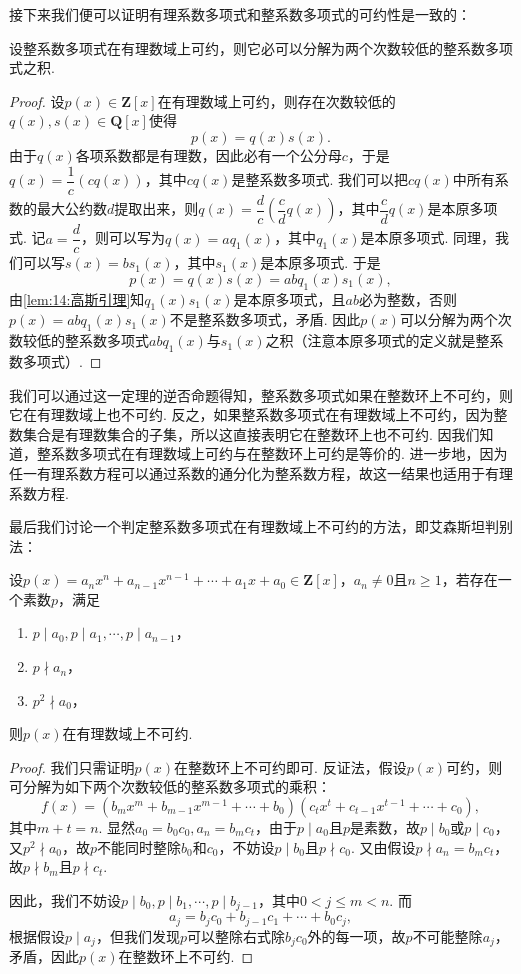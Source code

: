 接下来我们便可以证明有理系数多项式和整系数多项式的可约性是一致的：
\begin{theorem} \label{thm:14:有理系数多项式的可约性}
    设整系数多项式在有理数域上可约，则它必可以分解为两个次数较低的整系数多项式之积.
\end{theorem}
\begin{proof}
    设$p(x)\in\mathbf{Z}[x]$在有理数域上可约，则存在次数较低的$q(x),s(x)\in\mathbf{Q}[x]$使得
    \[p(x)=q(x)s(x).\]
    由于$q(x)$各项系数都是有理数，因此必有一个公分母$c$，于是$q(x)=\dfrac{1}{c}(cq(x))$，其中$cq(x)$是整系数多项式. 我们可以把$cq(x)$中所有系数的最大公约数$d$提取出来，则$q(x)=\dfrac{d}{c}(\dfrac{c}{d}q(x))$，其中$\dfrac{c}{d}q(x)$是本原多项式. 记$a=\dfrac{d}{c}$，则可以写为$q(x)=aq_1(x)$，其中$q_1(x)$是本原多项式. 同理，我们可以写$s(x)=bs_1(x)$，其中$s_1(x)$是本原多项式. 于是
    \[p(x)=q(x)s(x)=abq_1(x)s_1(x),\]
    由\autoref{lem:14:高斯引理}知$q_1(x)s_1(x)$是本原多项式，且$ab$必为整数，否则$p(x)=abq_1(x)s_1(x)$不是整系数多项式，矛盾. 因此$p(x)$可以分解为两个次数较低的整系数多项式$abq_1(x)$与$s_1(x)$之积（注意本原多项式的定义就是整系数多项式）.
\end{proof}

我们可以通过这一定理的逆否命题得知，整系数多项式如果在整数环上不可约，则它在有理数域上也不可约. 反之，如果整系数多项式在有理数域上不可约，因为整数集合是有理数集合的子集，所以这直接表明它在整数环上也不可约. 因我们知道，整系数多项式在有理数域上可约与在整数环上可约是等价的. 进一步地，因为任一有理系数方程可以通过系数的通分化为整系数方程，故这一结果也适用于有理系数方程.

最后我们讨论一个判定整系数多项式在有理数域上不可约的方法，即艾森斯坦判别法：
\begin{theorem}[艾森斯坦判别法] \label{thm:14:艾森斯坦判别法}
    设$p(x)=a_nx^n+a_{n-1}x^{n-1}+\cdots+a_1x+a_0\in\mathbf{Z}[x]$，$a_n\neq 0$且$n\geqslant 1$，若存在一个素数$p$，满足
    \begin{enumerate}
        \item $p\mid a_0,p\mid a_1,\cdots,p\mid a_{n-1}$，
        \item $p\nmid a_n$，
        \item $p^2\nmid a_0$，
    \end{enumerate}
    则$p(x)$在有理数域上不可约.
\end{theorem}
\begin{proof}
    我们只需证明$p(x)$在整数环上不可约即可. 反证法，假设$p(x)$可约，则可分解为如下两个次数较低的整系数多项式的乘积：
    \[f(x)=(b_mx^m+b_{m-1}x^{m-1}+\cdots+b_0)(c_tx^t+c_{t-1}x^{t-1}+\cdots+c_0),\]
    其中$m+t=n$. 显然$a_0=b_0c_0,a_n=b_mc_t$，由于$p\mid a_0$且$p$是素数，故$p\mid b_0$或$p\mid c_0$，又$p^2\nmid a_0$，故$p$不能同时整除$b_0$和$c_0$，不妨设$p\mid b_0$且$p\nmid c_0$. 又由假设$p\nmid a_n=b_mc_t$，故$p\nmid b_m$且$p\nmid c_t$.

    因此，我们不妨设$p\mid b_0,p\mid b_1,\cdots,p\mid b_{j-1}$，其中$0<j\leqslant m<n$. 而
    \[a_j=b_jc_0+b_{j-1}c_1+\cdots+b_0c_j,\]
    根据假设$p\mid a_j$，但我们发现$p$可以整除右式除$b_jc_0$外的每一项，故$p$不可能整除$a_j$，矛盾，因此$p(x)$在整数环上不可约.
\end{proof}

